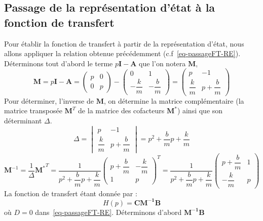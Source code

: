\subsection{Passage de la représentation d'état à la fonction de transfert}
Pour établir la fonction de transfert à partir de la représentation d'état, nous
allons appliquer la relation obtenue précédemment (c.f~\cref{eq-passageFT-RE}).
Déterminons tout d'abord le terme $p\boldsymbol{I}-\boldsymbol{A}$ que l'on 
notera $\boldsymbol{M}$,
\[
    \boldsymbol{M}=
    p\boldsymbol{I}-\boldsymbol{A}=
    \begin{pmatrix}
        p&0\\
        0&p
    \end{pmatrix}-
    \begin{pmatrix}
        0 & 1 \\[1em]
        -\dfrac{k}{m} & -\dfrac{b}{m}
    \end{pmatrix}=
    \begin{pmatrix}
        p & -1 \\
        \dfrac{k}{m} & p+\dfrac{b}{m}
    \end{pmatrix}
\]
Pour déterminer, l'inverse de $\boldsymbol{M}$, on détermine la matrice
complémentaire (la matrice transposée $\boldsymbol{M}^T$ de la matrice des 
cofacteurs $\boldsymbol{M^*}$) ainsi que son déterminant $\Delta$.
\[
    \Delta=
    \begin{vmatrix} 
        p & -1 \\[1em]
        \dfrac{k}{m} & p+\dfrac{b}{m}
    \end{vmatrix}=
    p^2+\dfrac{b}{m}p+\dfrac{k}{m}
\]
\[
    \boldsymbol{M}^{-1}=\dfrac{1}{\Delta}\boldsymbol{M^*}^T=
    \dfrac{1}{p^2+\dfrac{b}{m}p+\dfrac{k}{m}}
    \begin{pmatrix}
        p+\dfrac{b}{m} & -\dfrac{k}{m}\\[1em]
        1 & p
    \end{pmatrix}^T=
    \dfrac{1}{p^2+\dfrac{b}{m}p+\dfrac{k}{m}}
    \begin{pmatrix}
        p+\dfrac{b}{m} & 1 \\[1em]
        -\dfrac{k}{m} & p
    \end{pmatrix}
\]
La fonction de transfert étant donnée par :
\[
    H(p)=\boldsymbol{C}\boldsymbol{M^{-1}}\boldsymbol{B}
\]
où $D=0$ dans~\cref{eq-passageFT-RE}.
Déterminons d'abord $\boldsymbol{M^{-1}}\boldsymbol{B}$

